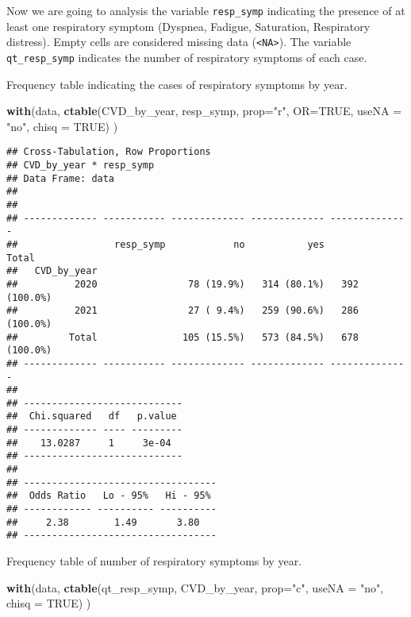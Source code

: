 \documentclass[
]{article}
\newenvironment{Shaded}{\begin{snugshade}}{\end{snugshade}}
\newcommand{\AttributeTok}[1]{\textcolor[rgb]{0.13,0.29,0.53}{#1}}
\newcommand{\ConstantTok}[1]{\textcolor[rgb]{0.56,0.35,0.01}{#1}}
\newcommand{\FunctionTok}[1]{\textcolor[rgb]{0.13,0.29,0.53}{\textbf{#1}}}
\newcommand{\NormalTok}[1]{#1}
\newcommand{\StringTok}[1]{\textcolor[rgb]{0.31,0.60,0.02}{#1}}
\begin{document}
Now we are going to analysis the variable \texttt{resp\_symp} indicating
the presence of at least one respiratory symptom (Dyspnea, Fadigue,
Saturation, Respiratory distress). Empty cells are considered missing
data (\texttt{\textless{}NA\textgreater{}}). The variable
\texttt{qt\_resp\_symp} indicates the number of respiratory symptoms of
each case.

Frequency table indicating the cases of respiratory symptoms by year.

\begin{Shaded}
\begin{Highlighting}[]
\FunctionTok{with}\NormalTok{(data, }\FunctionTok{ctable}\NormalTok{(CVD\_by\_year, resp\_symp, }\AttributeTok{prop=}\StringTok{"r"}\NormalTok{, }\AttributeTok{OR=}\ConstantTok{TRUE}\NormalTok{, }\AttributeTok{useNA =} \StringTok{"no"}\NormalTok{, }\AttributeTok{chisq =} \ConstantTok{TRUE}\NormalTok{)}
\NormalTok{)}
\end{Highlighting}
\end{Shaded}

\begin{verbatim}
## Cross-Tabulation, Row Proportions  
## CVD_by_year * resp_symp  
## Data Frame: data  
## 
## 
## ------------- ----------- ------------- ------------- --------------
##                 resp_symp            no           yes          Total
##   CVD_by_year                                                       
##          2020                78 (19.9%)   314 (80.1%)   392 (100.0%)
##          2021                27 ( 9.4%)   259 (90.6%)   286 (100.0%)
##         Total               105 (15.5%)   573 (84.5%)   678 (100.0%)
## ------------- ----------- ------------- ------------- --------------
## 
## ----------------------------
##  Chi.squared   df   p.value 
## ------------- ---- ---------
##    13.0287     1     3e-04  
## ----------------------------
## 
## ----------------------------------
##  Odds Ratio   Lo - 95%   Hi - 95% 
## ------------ ---------- ----------
##     2.38        1.49       3.80   
## ----------------------------------
\end{verbatim}

Frequency table of number of respiratory symptoms by year.

\begin{Shaded}
\begin{Highlighting}[]
\FunctionTok{with}\NormalTok{(data, }\FunctionTok{ctable}\NormalTok{(qt\_resp\_symp, CVD\_by\_year, }\AttributeTok{prop=}\StringTok{"c"}\NormalTok{, }\AttributeTok{useNA =} \StringTok{"no"}\NormalTok{, }\AttributeTok{chisq =} \ConstantTok{TRUE}\NormalTok{)}
\NormalTok{)}
\end{Highlighting}
\end{Shaded}
\end{document}
